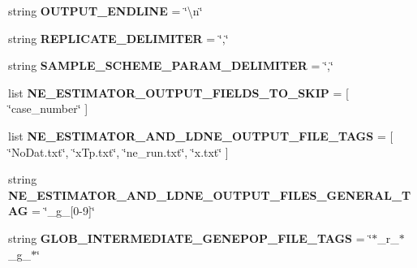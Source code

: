 \begin{DoxyCompactItemize}
\item 
string {\bfseries O\+U\+T\+P\+U\+T\+\_\+\+E\+N\+D\+L\+I\+NE} = \char`\"{}\textbackslash{}n\char`\"{}\hypertarget{namespacenegui_1_1pgdriveneestimator_aa40c91635517374f437b206fa5c12070}{}\label{namespacenegui_1_1pgdriveneestimator_aa40c91635517374f437b206fa5c12070}

\item 
string {\bfseries R\+E\+P\+L\+I\+C\+A\+T\+E\+\_\+\+D\+E\+L\+I\+M\+I\+T\+ER} = \char`\"{},\char`\"{}\hypertarget{namespacenegui_1_1pgdriveneestimator_a1193fcffbc197c97223fc41a886901f5}{}\label{namespacenegui_1_1pgdriveneestimator_a1193fcffbc197c97223fc41a886901f5}

\item 
string {\bfseries S\+A\+M\+P\+L\+E\+\_\+\+S\+C\+H\+E\+M\+E\+\_\+\+P\+A\+R\+A\+M\+\_\+\+D\+E\+L\+I\+M\+I\+T\+ER} = \char`\"{},\char`\"{}\hypertarget{namespacenegui_1_1pgdriveneestimator_afb91e259587f0231f20d658ce5cc6039}{}\label{namespacenegui_1_1pgdriveneestimator_afb91e259587f0231f20d658ce5cc6039}

\item 
list {\bfseries N\+E\+\_\+\+E\+S\+T\+I\+M\+A\+T\+O\+R\+\_\+\+O\+U\+T\+P\+U\+T\+\_\+\+F\+I\+E\+L\+D\+S\+\_\+\+T\+O\+\_\+\+S\+K\+IP} = \mbox{[} \char`\"{}case\+\_\+number\char`\"{} \mbox{]}\hypertarget{namespacenegui_1_1pgdriveneestimator_ae8a64dd815aff6a97f4651a4525c449e}{}\label{namespacenegui_1_1pgdriveneestimator_ae8a64dd815aff6a97f4651a4525c449e}

\item 
list {\bfseries N\+E\+\_\+\+E\+S\+T\+I\+M\+A\+T\+O\+R\+\_\+\+A\+N\+D\+\_\+\+L\+D\+N\+E\+\_\+\+O\+U\+T\+P\+U\+T\+\_\+\+F\+I\+L\+E\+\_\+\+T\+A\+GS} = \mbox{[} \char`\"{}No\+Dat.\+txt\char`\"{}, \char`\"{}x\+Tp.\+txt\char`\"{}, \char`\"{}ne\+\_\+run.\+txt\char`\"{}, \char`\"{}x.\+txt\char`\"{} \mbox{]}\hypertarget{namespacenegui_1_1pgdriveneestimator_a1849dccaf78707bab233fa6a57a29fe0}{}\label{namespacenegui_1_1pgdriveneestimator_a1849dccaf78707bab233fa6a57a29fe0}

\item 
string {\bfseries N\+E\+\_\+\+E\+S\+T\+I\+M\+A\+T\+O\+R\+\_\+\+A\+N\+D\+\_\+\+L\+D\+N\+E\+\_\+\+O\+U\+T\+P\+U\+T\+\_\+\+F\+I\+L\+E\+S\+\_\+\+G\+E\+N\+E\+R\+A\+L\+\_\+\+T\+AG} = \char`\"{}\+\_\+g\+\_\+\mbox{[}0-\/9\mbox{]}\char`\"{}\hypertarget{namespacenegui_1_1pgdriveneestimator_a2476a4171478c9b09a27a1287121a7cc}{}\label{namespacenegui_1_1pgdriveneestimator_a2476a4171478c9b09a27a1287121a7cc}

\item 
string {\bfseries G\+L\+O\+B\+\_\+\+I\+N\+T\+E\+R\+M\+E\+D\+I\+A\+T\+E\+\_\+\+G\+E\+N\+E\+P\+O\+P\+\_\+\+F\+I\+L\+E\+\_\+\+T\+A\+GS} = \char`\"{}$\ast$\+\_\+r\+\_\+$\ast$\+\_\+g\+\_\+$\ast$\char`\"{}\hypertarget{namespacenegui_1_1pgdriveneestimator_ae1d8c4de97e82bc6f70762621e961790}{}\label{namespacenegui_1_1pgdriveneestimator_ae1d8c4de97e82bc6f70762621e961790}


\end{DoxyCompactItemize}

